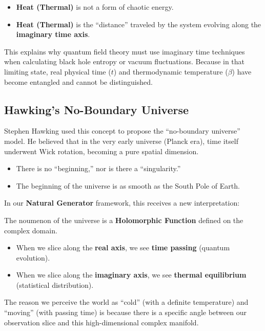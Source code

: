 \begin{itemize}
\item \textbf{Heat (Thermal)} is not a form of chaotic energy.

\item \textbf{Heat (Thermal)} is the ``distance'' traveled by the system evolving along the \textbf{imaginary time axis}.
\end{itemize}

This explains why quantum field theory must use imaginary time techniques when calculating black hole entropy or vacuum fluctuations. Because in that limiting state, real physical time ($t$) and thermodynamic temperature ($\beta$) have become entangled and cannot be distinguished.

\subsection{Hawking's No-Boundary Universe}

Stephen Hawking used this concept to propose the ``no-boundary universe'' model. He believed that in the very early universe (Planck era), time itself underwent Wick rotation, becoming a pure spatial dimension.

\begin{itemize}
\item There is no ``beginning,'' nor is there a ``singularity.''

\item The beginning of the universe is as smooth as the South Pole of Earth.
\end{itemize}

In our \textbf{Natural Generator} framework, this receives a new interpretation:

The noumenon of the universe is a \textbf{Holomorphic Function} defined on the complex domain.

\begin{itemize}
\item When we slice along the \textbf{real axis}, we see \textbf{time passing} (quantum evolution).

\item When we slice along the \textbf{imaginary axis}, we see \textbf{thermal equilibrium} (statistical distribution).
\end{itemize}

The reason we perceive the world as ``cold'' (with a definite temperature) and ``moving'' (with passing time) is because there is a specific angle between our observation slice and this high-dimensional complex manifold.

